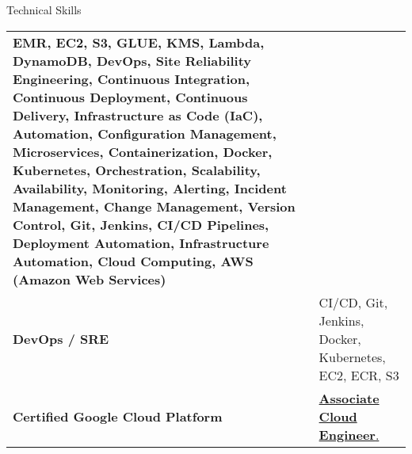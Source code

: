 \documentclass{resume} %
\begin{document}
\begin{rSection}{Technical Skills}
\begin{tabular}{ @{} >{\bfseries}l @{\hspace{1ex}} l }
\newcommand\myfontsize{\fontsize{.1pt}{.1pt}\selectfont} \myfontsize \color{white}
{EMR, EC2, S3, GLUE, KMS, Lambda, DynamoDB, DevOps, Site Reliability Engineering, Continuous Integration, Continuous Deployment, Continuous Delivery, Infrastructure as Code (IaC), Automation, Configuration Management, Microservices, Containerization, Docker, Kubernetes, Orchestration, Scalability, Availability, Monitoring, Alerting, Incident Management, Change Management, Version Control, Git, Jenkins, CI/CD Pipelines, Deployment Automation, Infrastructure Automation, Cloud Computing, AWS (Amazon Web Services)}\\

DevOps / SRE & CI/CD, Git, Jenkins, Docker, Kubernetes, EC2, ECR, S3\\
Certified Google Cloud Platform & \href{https://www.credential.net/c799d945-5e89-47a3-845e-8b97575a8342}{\textbf{Associate Cloud Engineer}.} \\


\end{tabular}
\end{rSection}
\end{document}
